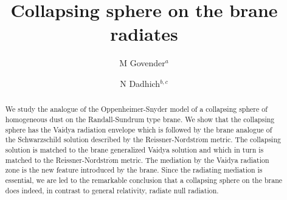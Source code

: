 \documentclass[a4paper,twocolumn,showpacs,preprintnumbers,amsmath,amssymb]{revtex4}
\begin{document}
\title{Collapsing sphere on the brane radiates}



\author{M Govender$^a$}
\author{N Dadhich$^{b,c}$}
\
\




\begin{abstract}
We study the analogue of the Oppenheimer-Snyder model of a collapsing sphere
of homogeneous dust on the Randall-Sundrum type brane. We show that the
collapsing sphere has the Vaidya radiation envelope which is followed by
the brane analogue of the Schwarzschild solution described by the
Reissner-Nordstr${\ddot o}$m metric. The collapsing solution is matched to 
the brane generalized Vaidya solution and which in turn is matched to the 
Reissner-Nordstr${\ddot o}$m metric. The mediation by the Vaidya radiation 
zone is 
the new feature introduced by the brane. Since the radiating mediation is 
essential, we are led to the remarkable conclusion that a collapsing 
sphere on the brane does indeed, in contrast to general relativity, 
radiate null radiation.
\end{abstract}




\maketitle



\end{document}
